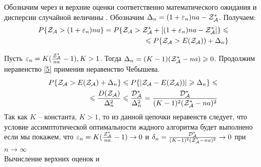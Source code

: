 \documentclass[a4paper, 14pt]{extarticle}
\numberwithin{equation}{section}
\begin{document}
Обозначим через \topboundE{} и \topboundD{} верхние оценки соответственно математического ожидания \randomvalueE{} и дисперсии \randomvalueD{} случайной величины \randomvalue{} . Обозначим $\Delta_n=(1+\varepsilon_n)na-\text{$\mathcal{Z^*_{A}}$}$. Получаем:
\begin{equation}\label{5}
\begin{aligned}
P\{\text{$\mathcal{Z_{A}}$} > (1+\varepsilon_n)na\} = 
P\{\text{$\mathcal{Z_{A}}$} > \text{$\mathcal{Z^*_{A}}$}+[(1+\varepsilon_n)na-\text{$\mathcal{Z^*_{A}}$}]\} \leqslant \\
\leqslant
P\{\text{$\mathcal{Z_{A}}$} > \text{$E(\text{$\mathcal{Z_{A}}$})$})+ \Delta_n\}
\end{aligned}
\end{equation}

Пусть $\varepsilon_n = K(\frac{\text{$\mathcal{Z^*_{A}}$}}{na}-1), K>1$.
Тогда $ \Delta_n = (K-1)(\text{$\mathcal{Z^*_{A}}$}-na) \geqslant 0$.
Продолжим неравенство \eqref{5} применив неравенство Чебышева.
\begin{align*}\label{6}
P\{\text{$\mathcal{Z_{A}}$}> E(\text{$\mathcal{Z_{A}}$})+ \Delta_n\} \leqslant 
P\{|\text{$\mathcal{Z_{A}}$}- \text{$E(\text{$\mathcal{Z_{A}}$})$})| \geqslant \Delta_n\} \leqslant \\
\leqslant \frac{\text{$D(\text{$\mathcal{Z_{A}}$})$}}{\Delta^2_n} \leqslant
\frac{\text{$\mathcal{D^*_{A}}$}}{\Delta^2_n} = 
\frac{\text{$\mathcal{D^*_{A}}$}}{(K-1)^2(\text{$\mathcal{Z^*_{A}}$}-na)^2}
\end{align*}
Так как $K$ -- константа, $K>1$, то из данной цепочки неравенств следует, что условие ассимптотической оптимальности жадного алгоритма будет выполнено если мы покажем, что
$ \varepsilon_n=K(\frac{\text{$\mathcal{Z^*_{A}}$}}{na}-1) \rightarrow 0$ и 
$ \delta_n = \frac{\text{$\mathcal{D^*_{A}}$}}{(K-1)^2(\text{$\mathcal{Z^*_{A}}$}-na)^2} \rightarrow 0$ при $ n \rightarrow \infty$\\

Вычисление верхних оценок \topboundE{} и \topboundD{}\\

\newcommand{\chanceLklesserX}{$\Phi_k(x)$}
\newcommand{\randomNormalValueE}{$l_k$}
\end{document}
